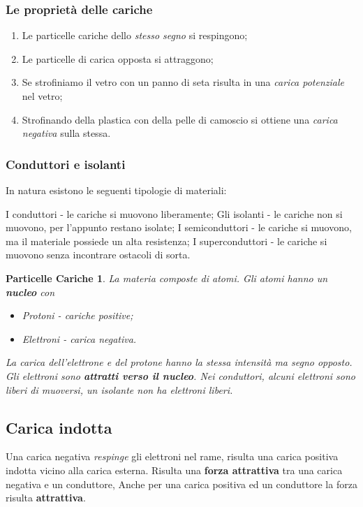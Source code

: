 \documentclass{book}
\begin{document}
\subsubsection{Le proprietà delle cariche}
\begin{enumerate}
	\item Le particelle cariche dello \textit{stesso segno} si respingono;
	\item Le particelle di carica opposta si attraggono;
	\item Se strofiniamo il vetro con un panno di seta risulta in una
		\textit{carica potenziale} nel vetro;
	\item Strofinando della plastica con della pelle di camoscio si ottiene una
		\textit{carica negativa} sulla stessa.
\end{enumerate}
\subsubsection{Conduttori e isolanti}
In natura esistono le seguenti tipologie di materiali:
\begin{tasks}{2}
	\task I conduttori - le cariche si muovono liberamente;
	\task Gli isolanti - le cariche non si muovono, per l'appunto restano
	isolate;
	\task I semiconduttori - le cariche si muovono, ma il materiale possiede un
	alta resistenza;
	\task I superconduttori - le cariche si muovono senza incontrare ostacoli
	di sorta.
\end{tasks}
\newtheorem{pcariche}{Particelle Cariche}
\begin{pcariche}
	La materia composte di atomi. Gli atomi hanno un \textbf{nucleo} con
	\begin{itemize}
		\item Protoni - cariche positive;
		\item Elettroni - carica negativa.
	\end{itemize}
	La carica dell'elettrone e del protone hanno la stessa intensità ma segno
	opposto. Gli elettroni sono \textbf{attratti verso il nucleo}. Nei
	conduttori, alcuni elettroni sono \textit{liberi di muoversi}, un isolante
	\textit{non ha elettroni liberi}.
\end{pcariche}
\subsection{Carica indotta}
Una carica negativa \textit{respinge} gli elettroni nel rame, risulta una
carica positiva indotta vicino alla carica esterna. Risulta una \textbf{forza
attrattiva} tra una carica negativa e un conduttore, Anche per una carica
positiva ed un conduttore la forza risulta \textbf{attrattiva}.
\end{document}
